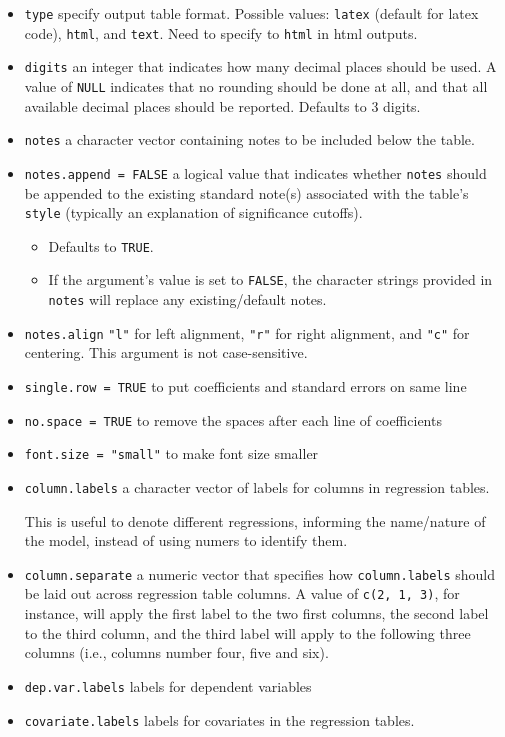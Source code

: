 \documentclass[
  a4paper,
  twoside,
  openright]{book}
\providecommand{\tightlist}{%
  \setlength{\itemsep}{0pt}\setlength{\parskip}{0pt}}
\theoremstyle{definition}
\theoremstyle{definition}
\theoremstyle{definition}
\theoremstyle{definition}
\theoremstyle{remark}
\begin{document}
\begin{itemize}
\item
  \texttt{type} specify output table format. Possible values: \texttt{latex} (default for latex code), \texttt{html}, and \texttt{text}. Need to specify to \texttt{html} in html outputs.
\item
  \texttt{digits} an integer that indicates how many decimal places should be used. A value of \texttt{NULL} indicates that no rounding should be done at all, and that all available decimal places should be reported. Defaults to 3 digits.
\item
  \texttt{notes} a character vector containing notes to be included below the table.
\item
  \texttt{notes.append\ =\ FALSE} a logical value that indicates whether \texttt{notes} should be appended to the existing standard note(s) associated with the table's \texttt{style} (typically an explanation of significance cutoffs).

  \begin{itemize}
  \tightlist
  \item
    Defaults to \texttt{TRUE}.
  \item
    If the argument's value is set to \texttt{FALSE}, the character strings provided in \texttt{notes} will replace any existing/default notes.
  \end{itemize}
\item
  \texttt{notes.align} \texttt{"l"} for left alignment, \texttt{"r"} for right alignment, and \texttt{"c"} for centering. This argument is not case-sensitive.
\item
  \texttt{single.row\ =\ TRUE} to put coefficients and standard errors on same line
\item
  {\texttt{no.space\ =\ TRUE}} to remove the spaces after each line of coefficients
\item
  \texttt{font.size\ =\ "small"} to make font size smaller
\item
  {\texttt{column.labels}} a character vector of labels for columns in regression tables.

  This is useful to denote different regressions, informing the name/nature of the model, instead of using numers to identify them.
\item
  \texttt{column.separate} a numeric vector that specifies how \texttt{column.labels} should be laid out across regression table columns. A value of \texttt{c(2,\ 1,\ 3)}, for instance, will apply the first label to the two first columns, the second label to the third column, and the third label will apply to the following three columns (i.e., columns number four, five and six).
\item
  \texttt{dep.var.labels} labels for dependent variables
\item
  {\texttt{covariate.labels}} labels for covariates in the regression tables.


\end{itemize}
\end{document}
